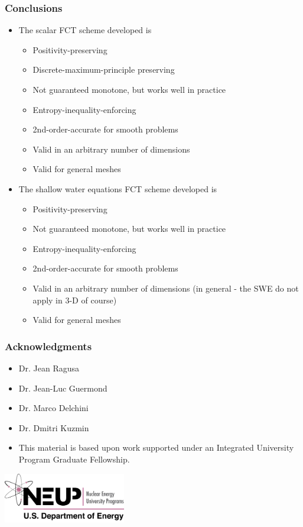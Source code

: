 \documentclass{beamer} \useoutertheme{infolines}
\begin{document}
\begin{frame}
\frametitle{Conclusions}

\begin{itemize}
  \item The scalar FCT scheme developed is
    \begin{itemize}
      \item Positivity-preserving
      \item Discrete-maximum-principle preserving
      \item Not guaranteed monotone, but works well in practice
      \item Entropy-inequality-enforcing
      \item 2nd-order-accurate for smooth problems
      \item Valid in an arbitrary number of dimensions
      \item Valid for general meshes
    \end{itemize}
  \item The shallow water equations FCT scheme developed is
    \begin{itemize}
      \item Positivity-preserving
      \item Not guaranteed monotone, but works well in practice
      \item Entropy-inequality-enforcing
      \item 2nd-order-accurate for smooth problems
      \item Valid in an arbitrary number of dimensions (in general - the SWE
        do not apply in 3-D of course)
      \item Valid for general meshes
    \end{itemize}
\end{itemize}

\end{frame}
\begin{frame}
\frametitle{Acknowledgments}

\begin{itemize}
   \item Dr. Jean Ragusa
   \item Dr. Jean-Luc Guermond
   \item Dr. Marco Delchini
   \item Dr. Dmitri Kuzmin
\end{itemize}
\begin{itemize}
   \item This material is based upon work supported under an Integrated University
      Program Graduate Fellowship.
\end{itemize}

\begin{center}
   \includegraphics[width=0.4\textwidth]{./figures/NEUP_Final_Logo_Version-09.jpg}
\end{center}
\end{frame}
\end{document}
